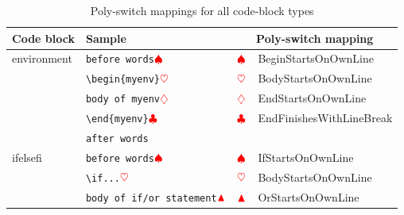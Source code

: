     \clearpage
	\begin{longtable}{llll}
		\caption{Poly-switch mappings for all code-block types}\label{tab:poly-switch-mapping}                                                                                                                         \\
		\toprule
		Code block                             & Sample                                                  & \multicolumn{2}{c}{Poly-switch mapping}                                                                     \\
		\midrule
		environment                            & \verb!before words!$\color{red}\spadesuit$      & $\color{red}\spadesuit$                 & BeginStartsOnOwnLine                                              \\
		                                       & \verb!\begin{myenv}!$\color{red}\heartsuit$       & $\color{red}\heartsuit$                  & BodyStartsOnOwnLine                                               \\
		                                       & \verb!body of myenv!$\color{red}\diamondsuit$        & $\color{red}\diamondsuit$                   & EndStartsOnOwnLine                                                \\
		                                       & \verb!\end{myenv}!$\color{red}\clubsuit$  & $\color{red}\clubsuit$             & EndFinishesWithLineBreak                                          \\
		                                       & \verb!after words!                             &                                         &                                                                   \\
		\cmidrule{2-4}
		ifelsefi                               & \verb!before words!$\color{red}\spadesuit$      & $\color{red}\spadesuit$                 & IfStartsOnOwnLine                                                 \\
		                                       & \verb!\if...!$\color{red}\heartsuit$       & $\color{red}\heartsuit$                  & BodyStartsOnOwnLine                                               \\
		                                       & \verb!body of if/or statement!$\color{red}\blacktriangle$         & $\color{red}\blacktriangle$                    & OrStartsOnOwnLine                                                 %

\end{longtable}
